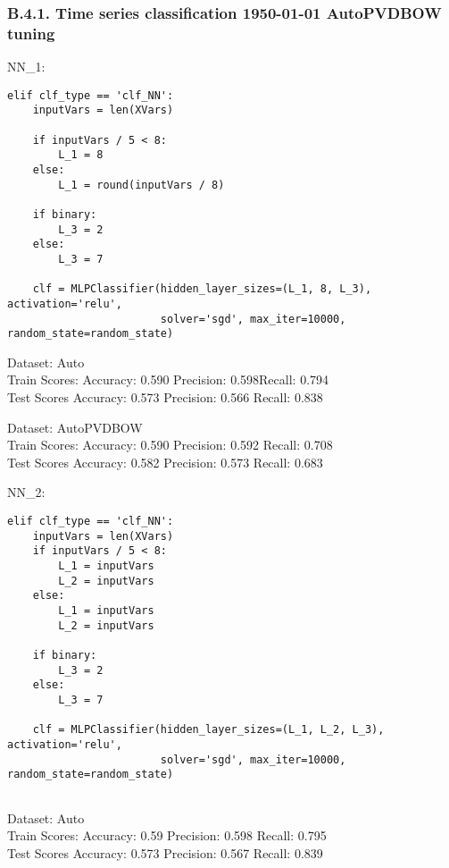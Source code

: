 \documentclass[11pt,preprint, authoryear]{elsarticle}
\numberwithin{equation}{section}
\numberwithin{figure}{section}
\numberwithin{table}{section}
\begin{document}
\hypertarget{b.4.1.-time-series-classification-1950-01-01-autopvdbow-tuning}{%
\subsubsection*{B.4.1. Time series classification 1950-01-01 AutoPVDBOW
tuning}\label{b.4.1.-time-series-classification-1950-01-01-autopvdbow-tuning}}

NN\_1:

\begin{verbatim}
elif clf_type == 'clf_NN':  
    inputVars = len(XVars)
    
    if inputVars / 5 < 8:
        L_1 = 8
    else:
        L_1 = round(inputVars / 8)

    if binary:
        L_3 = 2
    else:
        L_3 = 7

    clf = MLPClassifier(hidden_layer_sizes=(L_1, 8, L_3), activation='relu', 
                        solver='sgd', max_iter=10000, random_state=random_state)
\end{verbatim}

Dataset: Auto\\
Train Scores: Accuracy: 0.590 Precision: 0.598Recall: 0.794\\
Test Scores Accuracy: 0.573 Precision: 0.566 Recall: 0.838

Dataset: AutoPVDBOW\\
Train Scores: Accuracy: 0.590 Precision: 0.592 Recall: 0.708\\
Test Scores Accuracy: 0.582 Precision: 0.573 Recall: 0.683

NN\_2:

\begin{verbatim}
elif clf_type == 'clf_NN':
    inputVars = len(XVars)
    if inputVars / 5 < 8:
        L_1 = inputVars
        L_2 = inputVars
    else:
        L_1 = inputVars
        L_2 = inputVars

    if binary:
        L_3 = 2
    else:
        L_3 = 7

    clf = MLPClassifier(hidden_layer_sizes=(L_1, L_2, L_3), activation='relu', 
                        solver='sgd', max_iter=10000, random_state=random_state)
                        
\end{verbatim}

Dataset: Auto\\
Train Scores: Accuracy: 0.59 Precision: 0.598 Recall: 0.795\\
Test Scores Accuracy: 0.573 Precision: 0.567 Recall: 0.839
\end{document}
